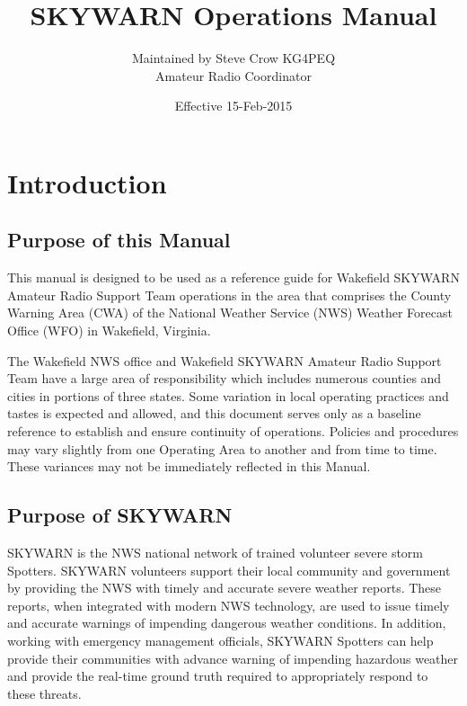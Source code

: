 \documentclass[pdflatex,letterpaper,twoside,12pt]{book}
\title             {SKYWARN Operations Manual}
\author            {Maintained by Steve Crow KG4PEQ\\Amateur Radio Coordinator}
\date              {Effective 15-Feb-2015}
\begin{document}
\skywarnTitlePage
\skipToTOC
\skywarnTOC


\chapter{Introduction}


\section{Purpose of this Manual}

This manual is designed to be used as a reference guide for Wakefield SKYWARN Amateur Radio Support Team operations in the area that comprises the County Warning Area (CWA) of the National Weather Service (NWS) Weather Forecast Office (WFO) in Wakefield, Virginia.

The Wakefield NWS office and Wakefield SKYWARN Amateur Radio Support Team have a large area of responsibility which includes numerous counties and cities in portions of three states.  Some variation in local operating practices and tastes is expected and allowed, and this document serves only as a baseline reference to establish and ensure continuity of operations.  Policies and procedures may vary slightly from one Operating Area to another and from time to time.  These variances may not be immediately reflected in this Manual.


\section{Purpose of SKYWARN}

SKYWARN is the NWS national network of trained volunteer severe storm Spotters. SKYWARN volunteers support their local community and government by providing the NWS with timely and accurate severe weather reports.  These reports, when integrated with modern NWS technology, are used to issue timely and accurate warnings of impending dangerous weather conditions.  In addition, working with emergency management officials, SKYWARN Spotters can help provide their communities with advance warning of impending hazardous weather and provide the real-time ground truth required to appropriately respond to these threats.
\end{document}
